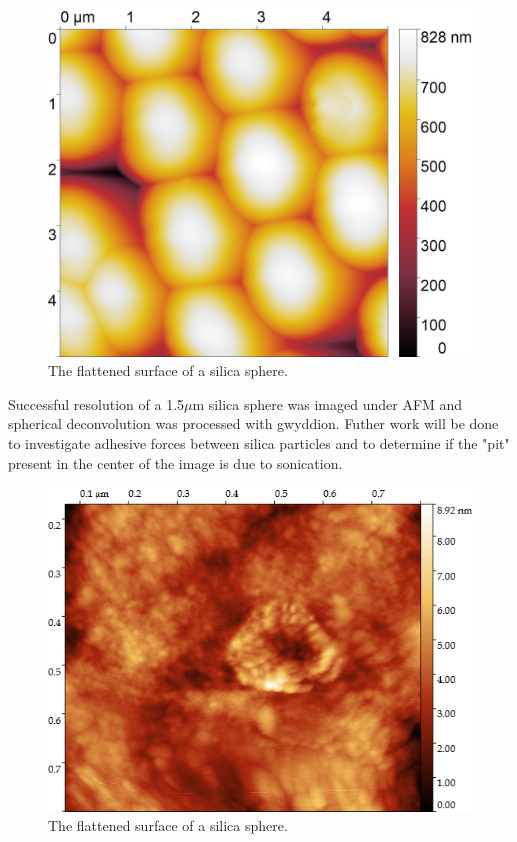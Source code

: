 \begin{figure}[h]     %
        \begin{center}
          \includegraphics[width=130mm]{chapter3/5umareat2.jpg}
\end{center}
\caption{The flattened surface of a silica sphere.}
\label{fig:Sili2}                 %
\end{figure}



Successful resolution of a 1.5$\mu$m silica sphere was imaged under AFM and spherical deconvolution was processed with gwyddion. \cite{gwy} Futher work will be done to investigate adhesive forces between silica particles and to determine if the "pit" present in the center of the image is due to sonication.

\begin{figure}[h]     %
        \begin{center}
          \includegraphics[width=130mm]{chapter3/Sili2.png}
\end{center}
\caption{The flattened surface of a silica sphere.}
\label{fig:Sili2}                 %
\end{figure}


